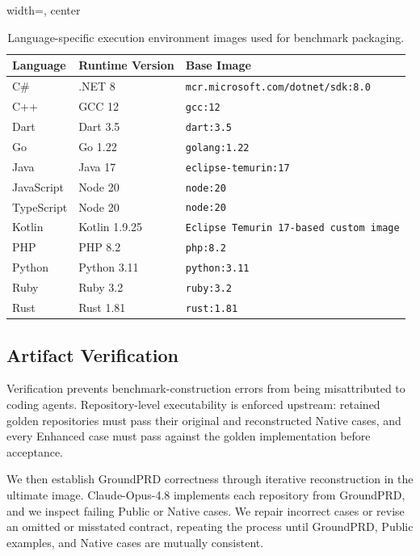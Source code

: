 \begin{table}[htbp]
\centering
\caption{Language-specific execution environment images used for benchmark packaging.}
\label{tab:image-versions}
\small
\begin{adjustbox}{width=\linewidth, center}
\begin{tabular}{lll}
\toprule
Language & Runtime Version & Base Image \\
\midrule
C\# & .NET 8 & \texttt{mcr.microsoft.com/dotnet/sdk:8.0} \\
C++ & GCC 12 & \texttt{gcc:12} \\
Dart & Dart 3.5 & \texttt{dart:3.5} \\
Go & Go 1.22 & \texttt{golang:1.22} \\
Java & Java 17 & \texttt{eclipse-temurin:17} \\
JavaScript & Node 20 & \texttt{node:20} \\
TypeScript & Node 20 & \texttt{node:20} \\
Kotlin & Kotlin 1.9.25 & \texttt{Eclipse Temurin 17-based custom image} \\
PHP & PHP 8.2 & \texttt{php:8.2} \\
Python & Python 3.11 & \texttt{python:3.11} \\
Ruby & Ruby 3.2 & \texttt{ruby:3.2} \\
Rust & Rust 1.81 & \texttt{rust:1.81} \\
\bottomrule
\end{tabular}
\end{adjustbox}
\end{table}

\subsection{Artifact Verification}
\label{sec:artifact-verification}

Verification prevents benchmark-construction errors from being misattributed to coding agents. Repository-level executability is enforced upstream: retained golden repositories must pass their original and reconstructed Native cases, and every Enhanced case must pass against the golden implementation before acceptance.

We then establish GroundPRD correctness through iterative reconstruction in the ultimate image. Claude-Opus-4.8 implements each repository from GroundPRD, and we inspect failing Public or Native cases. We repair incorrect cases or revise an omitted or misstated contract, repeating the process until GroundPRD, Public examples, and Native cases are mutually consistent.


